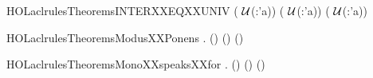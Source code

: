 \newcommand{\HOLaclrulesTheoremsImageXXUNION}{\UseVerbatim{HOLaclrulesTheoremsImageXXUNION}}
\begin{SaveVerbatim}{HOLaclrulesTheoremsINTERXXEQXXUNIV}
\HOLTokenTurnstile{} ( \HOLConst{\HOLTokenInter{}}  \HOLSymConst{=} \ensuremath{\cal{U}}(:'a)) \HOLSymConst{\HOLTokenEquiv{}} ( \HOLSymConst{=} \ensuremath{\cal{U}}(:'a)) \HOLSymConst{\HOLTokenConj{}} ( \HOLSymConst{=} \ensuremath{\cal{U}}(:'a))
\end{SaveVerbatim}
\newcommand{\HOLaclrulesTheoremsINTERXXEQXXUNIV}{\UseVerbatim{HOLaclrulesTheoremsINTERXXEQXXUNIV}}
\begin{SaveVerbatim}{HOLaclrulesTheoremsModusXXPonens}
\HOLTokenTurnstile{} \HOLSymConst{\HOLTokenForall{}}    .
     (\HOLSymConst{,}\HOLSymConst{,})   \HOLSymConst{\HOLTokenImp{}}
     (\HOLSymConst{,}\HOLSymConst{,})     \HOLSymConst{\HOLTokenImp{}}
     (\HOLSymConst{,}\HOLSymConst{,})  
\end{SaveVerbatim}
\newcommand{\HOLaclrulesTheoremsModusXXPonens}{\UseVerbatim{HOLaclrulesTheoremsModusXXPonens}}
\begin{SaveVerbatim}{HOLaclrulesTheoremsMonoXXspeaksXXfor}
\HOLTokenTurnstile{} \HOLSymConst{\HOLTokenForall{}}      .
     (\HOLSymConst{,}\HOLSymConst{,})     \HOLSymConst{\HOLTokenImp{}}
     (\HOLSymConst{,}\HOLSymConst{,})     \HOLSymConst{\HOLTokenImp{}}
     (\HOLSymConst{,}\HOLSymConst{,})        
\end{SaveVerbatim}
\newcommand{\HOLaclrulesTheoremsMonoXXspeaksXXfor}{\UseVerbatim{HOLaclrulesTheoremsMonoXXspeaksXXfor}}
